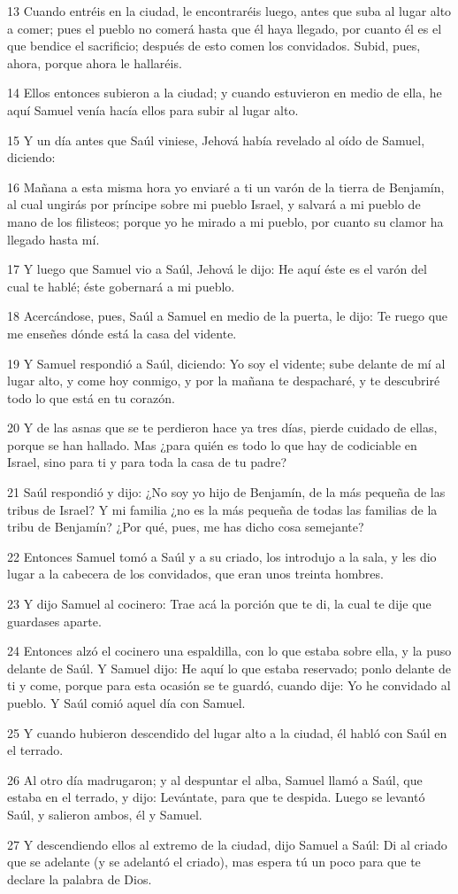 \par 13 Cuando entréis en la ciudad, le encontraréis luego, antes que suba al lugar alto a comer; pues el pueblo no comerá hasta que él haya llegado, por cuanto él es el que bendice el sacrificio; después de esto comen los convidados. Subid, pues, ahora, porque ahora le hallaréis.
\par 14 Ellos entonces subieron a la ciudad; y cuando estuvieron en medio de ella, he aquí Samuel venía hacía ellos para subir al lugar alto.
\par 15 Y un día antes que Saúl viniese, Jehová había revelado al oído de Samuel, diciendo:
\par 16 Mañana a esta misma hora yo enviaré a ti un varón de la tierra de Benjamín, al cual ungirás por príncipe sobre mi pueblo Israel, y salvará a mi pueblo de mano de los filisteos; porque yo he mirado a mi pueblo, por cuanto su clamor ha llegado hasta mí.
\par 17 Y luego que Samuel vio a Saúl, Jehová le dijo: He aquí éste es el varón del cual te hablé; éste gobernará a mi pueblo.
\par 18 Acercándose, pues, Saúl a Samuel en medio de la puerta, le dijo: Te ruego que me enseñes dónde está la casa del vidente.
\par 19 Y Samuel respondió a Saúl, diciendo: Yo soy el vidente; sube delante de mí al lugar alto, y come hoy conmigo, y por la mañana te despacharé, y te descubriré todo lo que está en tu corazón.
\par 20 Y de las asnas que se te perdieron hace ya tres días, pierde cuidado de ellas, porque se han hallado. Mas ¿para quién es todo lo que hay de codiciable en Israel, sino para ti y para toda la casa de tu padre?
\par 21 Saúl respondió y dijo: ¿No soy yo hijo de Benjamín, de la más pequeña de las tribus de Israel? Y mi familia ¿no es la más pequeña de todas las familias de la tribu de Benjamín? ¿Por qué, pues, me has dicho cosa semejante?
\par 22 Entonces Samuel tomó a Saúl y a su criado, los introdujo a la sala, y les dio lugar a la cabecera de los convidados, que eran unos treinta hombres.
\par 23 Y dijo Samuel al cocinero: Trae acá la porción que te di, la cual te dije que guardases aparte.
\par 24 Entonces alzó el cocinero una espaldilla, con lo que estaba sobre ella, y la puso delante de Saúl. Y Samuel dijo: He aquí lo que estaba reservado; ponlo delante de ti y come, porque para esta ocasión se te guardó, cuando dije: Yo he convidado al pueblo. Y Saúl comió aquel día con Samuel.
\par 25 Y cuando hubieron descendido del lugar alto a la ciudad, él habló con Saúl en el terrado.
\par 26 Al otro día madrugaron; y al despuntar el alba, Samuel llamó a Saúl, que estaba en el terrado, y dijo: Levántate, para que te despida. Luego se levantó Saúl, y salieron ambos, él y Samuel.
\par 27 Y descendiendo ellos al extremo de la ciudad, dijo Samuel a Saúl: Di al criado que se adelante (y se adelantó el criado), mas espera tú un poco para que te declare la palabra de Dios.

